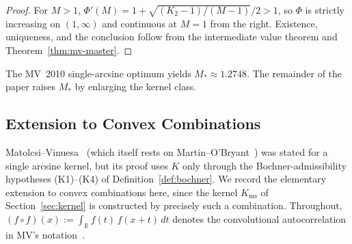 \documentclass[11pt, letterpaper]{article}
\theoremstyle{paperplain}
\theoremstyle{paperdef}
\newcommand{\R}{\mathbb{R}}
\newcommand{\Kms}{K_{\mathrm{ms}}}
\begin{document}
\begin{proof}
For $M>1$, $\Phi'(M)=1+\sqrt{(K_2-1)/(M-1)}/2>1$, so $\Phi$ is
strictly increasing on $(1,\infty)$ and continuous at $M=1$ from the
right.  Existence, uniqueness, and the conclusion follow from the
intermediate value theorem and Theorem~\ref{thm:mv-master}.
\end{proof}

The MV~2010 single-arcsine optimum yields $M_*\approx 1.2748$.  The
remainder of the paper raises $M_*$ by enlarging the kernel class.

\subsection{Extension to Convex Combinations}\label{subsec:mv-extension}

Matolcsi--Vinuesa~\cite[Lemma~3.1]{MV10} (which itself rests on
Martin--O'Bryant~\cite[Lemmas~3.1--3.4]{MO2009}) was stated for a
single arcsine kernel, but its proof uses $K$ only through the
Bochner-admissibility hypotheses
(K1)--(K4) of Definition~\ref{def:bochner}.  We record the
elementary extension to convex combinations here, since the kernel
$\Kms$ of Section~\ref{sec:kernel} is constructed by precisely such a
combination.  Throughout, $(f\circ f)(x):=\int_{\R}f(t)\,f(x+t)\,dt$
denotes the convolutional autocorrelation in MV's
notation~\cite[\S 3]{MV10}.
\end{document}

